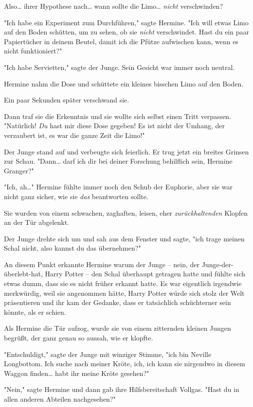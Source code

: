 {Also… ihrer Hypothese nach… wann sollte die Limo… \emph{nicht} verschwinden?

"Ich habe ein Experiment zum Durchführen," sagte Hermine. "Ich will etwas Limo auf den Boden schütten, um zu sehen, ob sie \emph{nicht} verschwindet. Hast du ein paar Papiertücher in deinem Beutel, damit ich die Pfütze aufwischen kann, wenn es nicht funktioniert?"

"Ich habe Servietten," sagte der Junge. Sein Gesicht war immer noch neutral.

Hermine nahm die Dose und schüttete ein kleines bisschen Limo auf den Boden.

Ein paar Sekunden später verschwand sie.

Dann traf sie die Erkenntnis und sie wollte sich selbst einen Tritt verpassen. "Natürlich! \emph{Du} hast mir diese Dose gegeben! Es ist nicht der Umhang, der verzaubert ist, es war die ganze Zeit die Limo!"

Der Junge stand auf und verbeugte sich feierlich. Er trug jetzt ein breites Grinsen zur Schau. "Dann… darf ich dir bei deiner Forschung behilflich sein, Hermine Granger?"

"Ich, ah…" Hermine fühlte immer noch den Schub der Euphorie, aber sie war nicht ganz sicher, wie sie \emph{das} beantworten sollte.

Sie wurden von einem schwachen, zaghaften, leisen, eher \emph{zurückhaltenden} Klopfen an der Tür abgelenkt.

Der Junge drehte sich um und sah aus dem Fenster und sagte, "ich trage meinen Schal nicht, also kannst du das übernehmen?"

An diesem Punkt erkannte Hermine warum der Junge -- nein, der Junge-der-überlebt-hat, Harry Potter -- den Schal überhaupt getragen hatte und fühlte sich etwas dumm, dass sie es nicht früher erkannt hatte. Es war eigentlich irgendwie merkwürdig, weil sie angenommen hätte, Harry Potter würde sich stolz der Welt präsentieren und ihr kam der Gedanke, dass er tatsächlich schüchterner sein könnte, als er schien.

Als Hermine die Tür aufzog, wurde sie von einem zitternden kleinen Jungen begrüßt, der ganz genau so aussah, wie er klopfte.

"Entschuldigt," sagte der Junge mit winziger Stimme, "ich bin Neville Longbottom. Ich suche nach meiner Kröte, ich, ich kann sie nirgendwo in diesem Waggon finden… habt ihr meine Kröte gesehen?"

"Nein," sagte Hermine und dann gab ihre Hilfsbereitschaft Vollgas. "Hast du in allen anderen Abteilen nachgesehen?"

}
